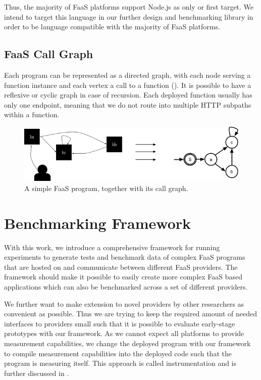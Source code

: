 \documentclass[../main.tex]{subfiles}
\begin{document}
Thus, the majority of FaaS platforms support Node.js as only or first target. 
We intend to target this language in our further design and benchmarking library 
in order to be language compatible with the majority of FaaS platforms.

\subsection{FaaS Call Graph}%
\label{sub:FaaSCallGraph}

Each program can be represented as a directed graph, 
with each node serving a function instance and each vertex a call to a function (). 
It is possible to have a reflexive or cyclic graph in case of recursion. 
Each deployed function usually has only one endpoint, 
meaning that we do not route into multiple HTTP subpaths within a function.

\begin{figure}
\begin{center}
  \includegraphics[width=\linewidth,keepaspectratio]{./simple-call-graph.png}
\end{center}
\caption[A FaaS Program's Call Graph]{A simple FaaS program, together with its call graph.}%
\label{fig:frameworkSimpleProgramCallGraph}
\end{figure}

\section{Benchmarking Framework}\label{sec:Framework}

With this work, we introduce a comprehensive framework for running experiments 
to generate tests and benchmark data of complex FaaS programs that are hosted on and communicate between different FaaS providers. 
The framework should make it possible to easily create more complex FaaS based applications which can also be benchmarked 
across a set of different providers.

We further want to make extension to novel providers by other researchers as convenient as possible. 
Thus we are trying to keep the required amount of needed interfaces to providers small 
such that it is possible to evaluate early-stage prototypes with our framework. 
As we cannot expect all platforms to provide measurement capabilities, 
we change the deployed program with our framework to compile measurement capabilities into the deployed code 
such that the program is measuring itself. 
This approach is called instrumentation and is further discussed in .
\end{document}
